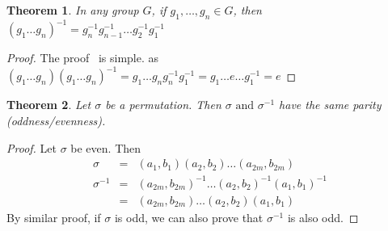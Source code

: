 \documentclass{article}
\theoremstyle{MyNonumberplain}
\theoremstyle{break}
\newtheorem*{proof}{Proof. }
\newcommand{\infixand}{\text{ and }}
\theoremstyle{break}
\newtheorem{theorem}{Theorem}[section]
\theoremstyle{break}
\theoremstyle{definition}
\theoremstyle{break}
\begin{document}
\begin{thmbox}
    \begin{theorem}
        In any group $G$, if $g_1, \ldots, g_n \in G$, then $(g_1 \ldots g_n)^{- 1} = g^{- 1}_n g^{- 1}_{n - 1} \ldots g^{- 1}_2 g^{- 1}_1$
    \end{theorem}
    \begin{prfbox}
        \begin{proof}
            The proof \ is simple. as $(g_1 \ldots g_n) (g_1 \ldots g_n)^{- 1} = g_1 \ldots g_n g^{- 1}_n g^{- 1}_1 = g_1 \ldots e \ldots g^{- 1}_1 = e$
        \end{proof}
    \end{prfbox}
\end{thmbox}

\begin{thmbox}
    \begin{theorem}
        Let $\sigma$ be a permutation. Then $\sigma \infixand \sigma^{- 1}$ have the same parity (oddness/evenness).
    \end{theorem}
    \begin{prfbox}
        \begin{proof}
            Let $\sigma$ be even. Then
            \begin{eqnarray*}
              \sigma & = & (a_1, b_1) (a_2, b_2) \ldots (a_{2 m}, b_{2 m})\\
              \sigma^{- 1} & = & (a_{2 m}, b_{2 m})^{- 1} \ldots (a_2, b_2)^{- 1} (a_1,
              b_1)^{- 1}\\
              & = & (a_{2 m}, b_{2 m}) \ldots (a_2, b_2) (a_1, b_1)
            \end{eqnarray*}
            By similar proof, if $\sigma$ is odd, we can also prove that $\sigma^{- 1}$ is
            also odd.
        \end{proof}
    \end{prfbox}
\end{thmbox}
\end{document}
